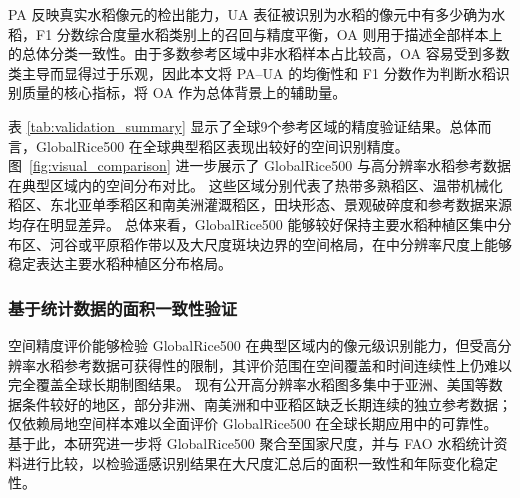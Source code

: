 \clearpage
PA 反映真实水稻像元的检出能力，UA 表征被识别为水稻的像元中有多少确为水稻，F1 分数综合度量水稻类别上的召回与精度平衡，OA 则用于描述全部样本上的总体分类一致性。由于多数参考区域中非水稻样本占比较高，OA 容易受到多数类主导而显得过于乐观，因此本文将 PA--UA 的均衡性和 F1 分数作为判断水稻识别质量的核心指标，将 OA 作为总体背景上的辅助量。

表 \ref{tab:validation_summary} 显示了全球9个参考区域的精度验证结果。总体而言，GlobalRice500 在全球典型稻区表现出较好的空间识别精度。
图~\ref{fig:visual_comparison} 进一步展示了 GlobalRice500 与高分辨率水稻参考数据在典型区域内的空间分布对比。
这些区域分别代表了热带多熟稻区、温带机械化稻区、东北亚单季稻区和南美洲灌溉稻区，田块形态、景观破碎度和参考数据来源均存在明显差异。
总体来看，GlobalRice500 能够较好保持主要水稻种植区集中分布区、河谷或平原稻作带以及大尺度斑块边界的空间格局，在中分辨率尺度上能够稳定表达主要水稻种植区分布格局。

\subsubsection{基于统计数据的面积一致性验证}
空间精度评价能够检验 GlobalRice500 在典型区域内的像元级识别能力，但受高分辨率水稻参考数据可获得性的限制，其评价范围在空间覆盖和时间连续性上仍难以完全覆盖全球长期制图结果。
现有公开高分辨率水稻图多集中于亚洲、美国等数据条件较好的地区，部分非洲、南美洲和中亚稻区缺乏长期连续的独立参考数据；仅依赖局地空间样本难以全面评价 GlobalRice500 在全球长期应用中的可靠性。
基于此，本研究进一步将 GlobalRice500 聚合至国家尺度，并与 FAO 水稻统计资料进行比较，以检验遥感识别结果在大尺度汇总后的面积一致性和年际变化稳定性。



